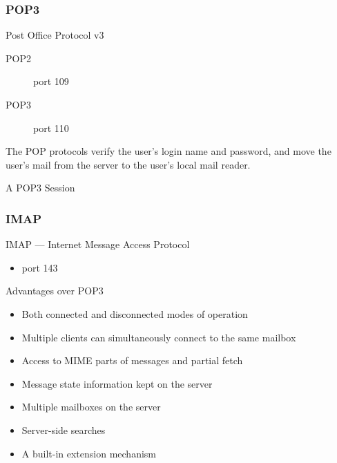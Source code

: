 \begin{frame}
  \begin{center}
  \end{center}
  \label{fig:smtp-pop3}
\end{frame}

\subsubsection{POP3}

\begin{frame}{Post Office Protocol v3}
  \begin{minipage}{.7\linewidth}
    \begin{description}
    \item[POP2] port 109
    \item[POP3] port 110
    \end{description}
    The POP protocols verify the user's login name and password, and move the user's mail
    from the server to the user's local mail reader.
  \end{minipage}\hfill
  \begin{minipage}{.2\linewidth}
    \begin{iblock}{A POP3 Session}
      \centering
      \mode<beamer>{ \texttt{[image: pop3\_session]} }%
      \label{fig:pop3_session}
    \end{iblock}
  \end{minipage}
\end{frame}
  
\subsubsection{IMAP}

\begin{frame}{IMAP --- Internet Message Access Protocol}
  \begin{itemize}
  \item port 143
  \end{itemize}
  \begin{iblock}{Advantages over POP3}
    \begin{itemize}
    \item Both connected and disconnected modes of operation
    \item Multiple clients can simultaneously connect to the same mailbox
    \item Access to MIME parts of messages and partial fetch
    \item Message state information kept on the server
    \item Multiple mailboxes on the server
    \item Server-side searches
    \item A built-in extension mechanism
    \end{itemize}
  \end{iblock}
\end{frame}

